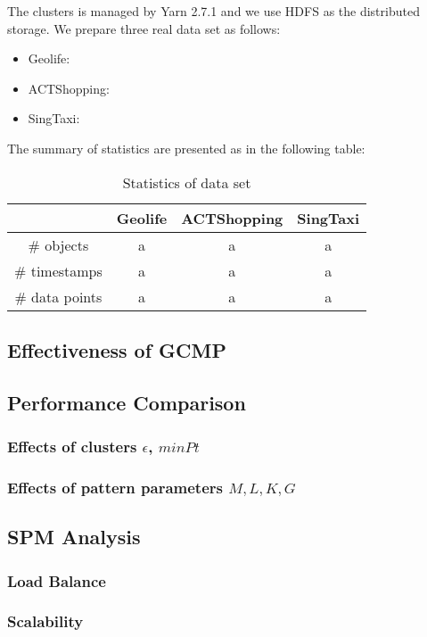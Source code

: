 The clusters is managed by Yarn 2.7.1 and we use HDFS
as the distributed storage. We prepare three real data
set as follows:
\begin{itemize}
\item{Geolife}:
\item{ACTShopping}:
\item{SingTaxi}:
\end{itemize}

The summary of statistics are presented as in the following table:

\begin{table}
\center
\caption{Statistics of data set}
\begin{tabular}{|c|c|c|c|}
\hline
 & Geolife & ACTShopping & SingTaxi \\ 
\hline 
\# objects & a & a & a\\ 
\hline
\# timestamps & a & a & a\\ 
\hline
\# data points & a & a & a\\ 
\hline
\end{tabular}
\end{table}


\subsection{Effectiveness of GCMP}

\subsection{Performance Comparison}
\subsubsection{Effects of clusters $\epsilon$, $minPt$}
\subsubsection{Effects of pattern parameters $M,L,K,G$}


\subsection{SPM Analysis}
\subsubsection{Load Balance}
\subsubsection{Scalability}



